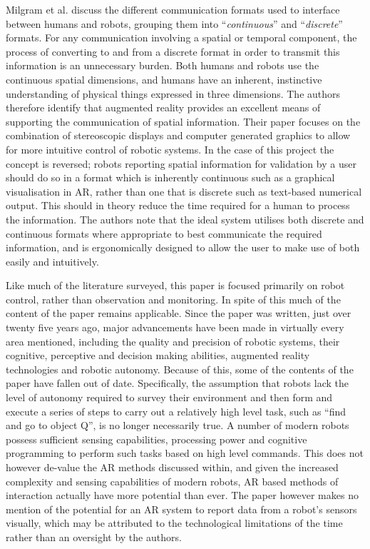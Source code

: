 Milgram et al. \cite{Milgram:1993} discuss the different communication formats used to interface between humans and robots, grouping them into ``\textit{continuous}'' and ``\textit{discrete}'' formats. For any communication involving a spatial or temporal component, the process of converting to and from a discrete format in order to transmit this information is an unnecessary burden. Both humans and robots use the continuous spatial dimensions, and humans have an inherent, instinctive understanding of physical things expressed in three dimensions. The authors \cite{Milgram:1993} therefore identify that  augmented reality provides an excellent means of supporting the communication of spatial information. Their paper focuses on the combination of stereoscopic displays and computer generated graphics to allow for more intuitive control of robotic systems. In the case of this project the concept is reversed; robots reporting spatial information for validation by a user should do so in a format which is inherently continuous such as a graphical visualisation in AR, rather than one that is discrete such as text-based numerical output. This should in theory reduce the time required for a human to process the information. The authors note \cite{Milgram:1993} that the ideal system utilises both discrete and continuous formats where appropriate to best communicate the required information, and is ergonomically designed to allow the user to make use of both easily and intuitively.

Like much of the literature surveyed, this paper \cite{Milgram:1993} is focused primarily on robot control, rather than observation and monitoring. In spite of this much of the content of the paper remains applicable. Since the paper was written, just over twenty five years ago, major advancements have been made in virtually every area mentioned, including the quality and precision of robotic systems, their cognitive, perceptive and decision making abilities, augmented reality technologies and robotic autonomy. Because of this, some of the contents of the paper have fallen out of date. Specifically, the assumption that robots lack the level of autonomy required to survey their environment and then form and execute a series of steps to carry out a relatively high level task, such as ``find and go to object Q''\cite{Milgram:1993}, is no longer necessarily true. A number of modern robots possess sufficient sensing capabilities, processing power and cognitive programming to perform such tasks based on high level commands. This does not however de-value the AR methods discussed within, and given the increased complexity and sensing capabilities of modern robots, AR based methods of interaction actually have more potential than ever. The paper however makes no mention of the potential for an AR system to report data from a robot's sensors visually, which may be attributed to the technological limitations of the time rather than an oversight by the authors.

